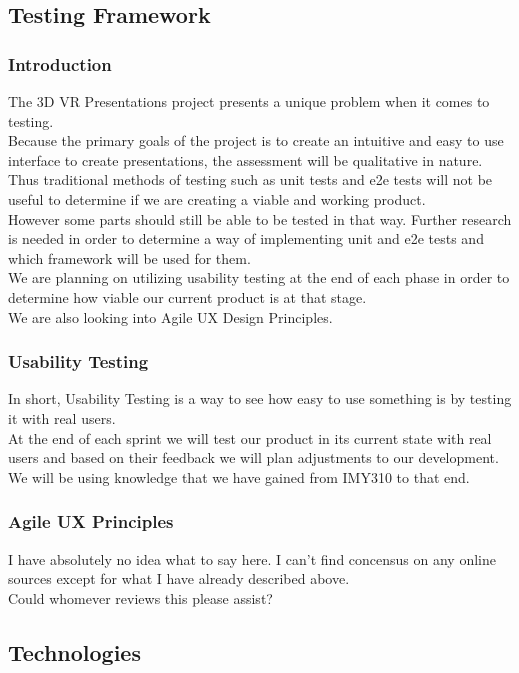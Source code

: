 \documentclass{article}
\begin{document}
\newpage

\subsection{Testing Framework}
	\subsubsection{Introduction}
		The 3D VR Presentations project presents a unique problem when it comes to testing.\\
		Because the primary goals of the project is to create an intuitive and easy to use interface to create presentations,
		the assessment will be qualitative in nature.\\
		Thus traditional methods of testing such as unit tests and e2e tests will not be useful to determine if we are creating a viable and working product.\\
		However some parts should still be able to be tested in that way. Further research is needed in order to determine a way of implementing unit and e2e tests and which framework will be used for them.\\
		We are planning on utilizing usability testing at the end of each phase in order to determine how viable our current product is at that stage.\\
		We are also looking into Agile UX Design Principles.

	\subsubsection{Usability Testing}
		In short, Usability Testing is a way to see how easy to use something is by testing it with real users.\\
		At the end of each sprint we will test our product in its current state with real users and based on their feedback we will plan adjustments to our development.
		We will be using knowledge that we have gained from IMY310 to that end.

	\subsubsection{Agile UX Principles}
		I have absolutely no idea what to say here. I can't find concensus on any online sources except for what I have already described above.\\
		Could whomever reviews this please assist?

\subsection{Technologies}
\end{document}
